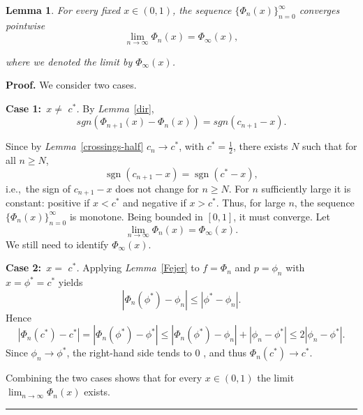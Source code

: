 \documentclass[onecolumn]{article}
\providecommand{\func}[1]{\operatorname{#1}}
\newtheorem{lemma}[theorem]{Lemma}
\newenvironment{proof}[1][Proof]{\noindent\textbf{#1.} }{\ \rule{0.5em}{0.5em}}
\begin{document}
\begin{lemma}
\label{Phi-pointwise} For every fixed $x\in (0,1)$, the sequence $\{\Phi
_{n}(x)\}_{n=0}^{\infty }$ converges pointwise 
\begin{equation}
\lim_{n\rightarrow \infty }\Phi _{n}(x)=\Phi _{\infty }(x),  \label{546a}
\end{equation}

where we denoted the limit by $\Phi _{\infty }(x)$.
\end{lemma}

\begin{proof}
We consider two cases.

\medskip \noindent \textbf{Case 1:}\emph{\ $x\neq $ }$c^{\ast }$\emph{.} By 
\textit{Lemma}~\ref{dir}, 
\begin{equation}
sgn(\Phi _{n+1}(x)-\Phi _{n}(x))=sgn(c_{n+1}-x).  \label{547}
\end{equation}

Since by \textit{Lemma}~\ref{crossings-half} $c_{n}\rightarrow c^{\ast }$,
with $c^{\ast }=\frac{1}{2}$, there exists $N$ such that for all $n\geq N$, 
\begin{equation*}
\func{sgn}(c_{n+1}-x)=\func{sgn}(c^{\ast }-x),
\end{equation*}%
i.e.,\ the sign of $c_{n+1}-x$ does not change for $n\geq N$. For $n$
sufficiently large it is constant: positive if $x<c^{\ast }$ and negative if 
$x>c^{\ast }$. Thus, for large $n$, the sequence $\{\Phi
_{n}(x)\}_{n=0}^{\infty }$ is monotone. Being bounded in $[0,1]$, it must
converge. Let 
\begin{equation}
\lim_{n\rightarrow \infty }\Phi _{n}(x)=\Phi _{\infty }(x).  \label{547a}
\end{equation}%
We still need to identify $\Phi _{\infty }(x)$.

\medskip \noindent \textbf{Case 2:}\emph{\ $x=$ }$c^{\ast }$\emph{.}
Applying \textit{Lemma}~\ref{Fejer} to $f=\Phi _{n}$ and $p=\phi _{n}$ with $%
x=\phi ^{\ast }=c^{\ast }$ yields 
\begin{equation}
|\Phi _{n}(\phi ^{\ast })-\phi _{n}|\leq |\phi ^{\ast }-\phi _{n}|.
\label{548}
\end{equation}%
Hence 
\begin{equation}
|\Phi _{n}(c^{\ast })-c^{\ast }|=|\Phi _{n}(\phi ^{\ast })-\phi ^{\ast
}|\leq |\Phi _{n}(\phi ^{\ast })-\phi _{n}|+|\phi _{n}-\phi ^{\ast }|\leq
2|\phi _{n}-\phi ^{\ast }|.  \label{549}
\end{equation}%
Since $\phi _{n}\rightarrow \phi ^{\ast }$, the right-hand side tends to $0$%
, and thus $\Phi _{n}(c^{\ast })\rightarrow c^{\ast }.$

Combining the two cases shows that for every $x\in (0,1)$ the limit $%
\lim_{n\rightarrow \infty }\Phi _{n}(x)$ exists.
\end{proof}
\end{document}
